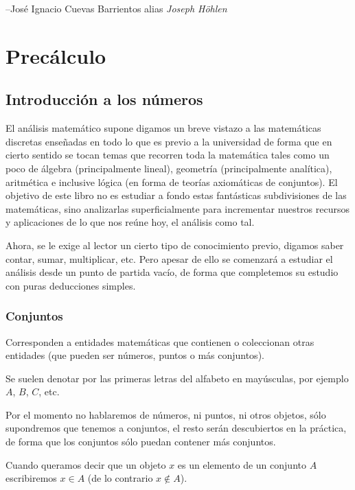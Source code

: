\documentclass[11pt,oneside,a4paper]{book}
\begin{document}
\hfill --José Ignacio Cuevas Barrientos alias \textit{Joseph Höhlen}

\mainmatter
\part{Precálculo}

\chapter{Introducción a los números}
El análisis matemático supone digamos un breve vistazo a las matemáticas discretas enseñadas en todo lo que es previo a la universidad de forma que en cierto sentido se tocan temas que recorren toda la matemática tales como un poco de álgebra (principalmente lineal), geometría (principalmente analítica), aritmética e inclusive lógica (en forma de teorías axiomáticas de conjuntos). El objetivo de este libro no es estudiar a fondo estas fantásticas subdivisiones de las matemáticas, sino analizarlas superficialmente para incrementar nuestros recursos y aplicaciones de lo que nos reúne hoy, el análisis como tal.

Ahora, se le exige al lector un cierto tipo de conocimiento previo, digamos saber contar, sumar, multiplicar, etc. Pero apesar de ello se comenzará a estudiar el análisis desde un punto de partida vacío, de forma que completemos su estudio con puras deducciones simples.

\section{Conjuntos}
\begin{mydef}[Conjuntos]
Corresponden a entidades matemáticas que contienen o coleccionan otras entidades (que pueden ser números, puntos o más conjuntos).

Se suelen denotar por las primeras letras del alfabeto en mayúsculas, por ejemplo $A$, $B$, $C$, etc.
\end{mydef}
Por el momento no hablaremos de números, ni puntos, ni otros objetos, sólo supondremos que tenemos a conjuntos, el resto serán descubiertos en la práctica, de forma que los conjuntos sólo puedan contener más conjuntos.

Cuando queramos decir que un objeto $x$ es un elemento de un conjunto $A$ escribiremos $x\in A$ (de lo contrario $x\notin A$).
\end{document}
